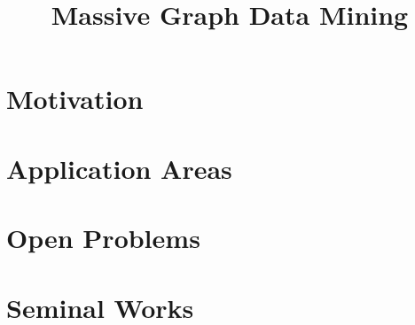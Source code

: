 \documentclass{scrartcl}
\begin{document}
  
  \title{Massive Graph Data Mining}
  \maketitle
    
\section{Motivation}


\section{Application Areas}


\section{Open Problems}


\section{Seminal Works}
\end{document}
